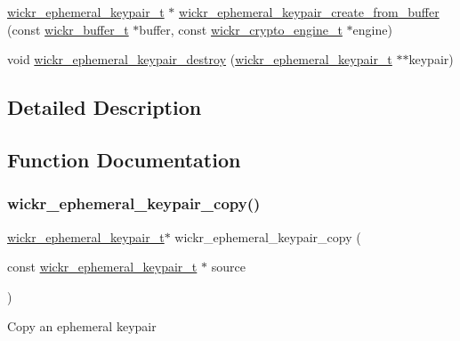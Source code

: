 \begin{DoxyCompactItemize}
\item 
\mbox{\hyperlink{structwickr__ephemeral__keypair}{wickr\+\_\+ephemeral\+\_\+keypair\+\_\+t}} $\ast$ \mbox{\hyperlink{group__wickr__ephemeral__keypair_ga7ecd3769c68ba5bfbc95a225c1021ed0}{wickr\+\_\+ephemeral\+\_\+keypair\+\_\+create\+\_\+from\+\_\+buffer}} (const \mbox{\hyperlink{structwickr__buffer}{wickr\+\_\+buffer\+\_\+t}} $\ast$buffer, const \mbox{\hyperlink{structwickr__crypto__engine}{wickr\+\_\+crypto\+\_\+engine\+\_\+t}} $\ast$engine)
\item 
void \mbox{\hyperlink{group__wickr__ephemeral__keypair_gab77107c0b1a0d145c606817eeecec63d}{wickr\+\_\+ephemeral\+\_\+keypair\+\_\+destroy}} (\mbox{\hyperlink{structwickr__ephemeral__keypair}{wickr\+\_\+ephemeral\+\_\+keypair\+\_\+t}} $\ast$$\ast$keypair)
\end{DoxyCompactItemize}


\subsection{Detailed Description}


\subsection{Function Documentation}
\mbox{\label{group__wickr__ephemeral__keypair_gacf14f050221091093b9a2948bd569662}} 
\subsubsection{\texorpdfstring{wickr\_ephemeral\_keypair\_copy()}{wickr\_ephemeral\_keypair\_copy()}}
{\footnotesize\ttfamily \mbox{\hyperlink{structwickr__ephemeral__keypair}{wickr\+\_\+ephemeral\+\_\+keypair\+\_\+t}}$\ast$ wickr\+\_\+ephemeral\+\_\+keypair\+\_\+copy (\begin{DoxyParamCaption}\item[{const \mbox{\hyperlink{structwickr__ephemeral__keypair}{wickr\+\_\+ephemeral\+\_\+keypair\+\_\+t}} $\ast$}]{source }\end{DoxyParamCaption})}

Copy an ephemeral keypair



